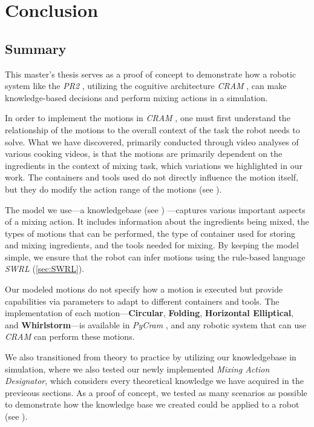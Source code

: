 \chapter{Conclusion}
\label{chap:conclusion}

\section{Summary}
This master's thesis serves as a proof of concept to demonstrate how a robotic system like the \textit{PR2} \cite{pr2}, utilizing the cognitive architecture \textit{CRAM} \cite{beetz10cram}, can make knowledge-based decisions and perform mixing actions in a simulation.

In order to implement the motions in \textit{CRAM} \cite{beetz10cram}, one must first understand the relationship of the motions to the overall context of the task the robot needs to solve. What we have discovered, primarily conducted through video analyses of various cooking videos, is that the motions are primarily dependent on the ingredients in the context of mixing task, which variations we highlighted in our work. The containers and tools used do not directly influence the motion itself, but they do modify the action range of the motions
(see ).

The model we use—a knowledgebase (see ) —captures various important aspects of a mixing action. It includes information about the ingredients being mixed, the types of motions that can be performed, the type of container used for storing and mixing ingredients, and the tools needed for mixing. By keeping the model simple, we ensure that the robot can infer motions using the rule-based language \textit{SWRL} (\ref{sec:SWRL}).

Our modeled motions do not specify how a motion is executed but provide capabilities via parameters to adapt to different containers and tools. The implementation of each motion—\textbf{Circular}, \textbf{Folding}, \textbf{Horizontal Elliptical}, and \textbf{Whirlstorm}—is available in \textit{PyCram} \cite{pycram}, and any robotic system that can use \textit{CRAM} \cite{beetz10cram} can perform these motions.

We also transitioned from theory to practice by utilizing our knowledgebase in simulation, where we also tested our newly implemented \textit{Mixing Action Designator}, which considers every theoretical knowledge we have acquired in the previeous sections. As a proof of concept, we tested as many scenarios as possible to demonstrate how the knowledge base we created could be applied to a robot (see ). 


